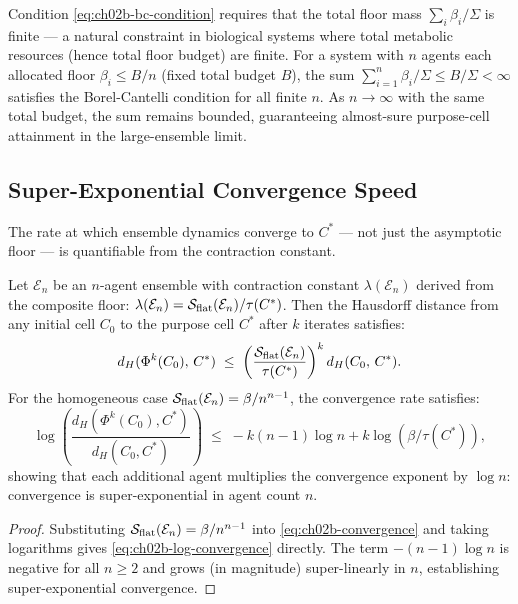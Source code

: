 \begin{remark}
Condition \eqref{eq:ch02b-bc-condition} requires that the total floor mass
$\sum_i \beta_i / \Sigma$ is finite — a natural constraint in biological
systems where total metabolic resources (hence total floor budget) are finite.
For a system with $n$ agents each allocated floor $\beta_i \leq B/n$ (fixed
total budget $B$), the sum $\sum_{i=1}^n \beta_i / \Sigma \leq B/\Sigma < \infty$
satisfies the Borel-Cantelli condition for all finite $n$.  As $n \to \infty$
with the same total budget, the sum remains bounded, guaranteeing almost-sure
purpose-cell attainment in the large-ensemble limit.
\end{remark}

\subsection{Super-Exponential Convergence Speed}

The rate at which ensemble dynamics converge to $C^*$ — not just the
asymptotic floor — is quantifiable from the contraction constant.

\begin{proposition}
\label{prop:ch02b-convergence-speed}
Let $\mathcal{E}_n$ be an $n$-agent ensemble with contraction constant
$\lambda(\mathcal{E}_n)$ derived from the composite floor:
$\lambda(\mathcal{E}_n) = \mathcal{S}_{\mathrm{flat}}(\mathcal{E}_n) / \tau(C^*)$.
Then the Hausdorff distance from any initial cell $C_0$ to the purpose cell
$C^*$ after $k$ iterates satisfies:
\begin{equation}
  d_H(\Phi^k(C_0),\, C^*)
  \;\leq\;
  \left(\frac{\mathcal{S}_{\mathrm{flat}}(\mathcal{E}_n)}{\tau(C^*)}\right)^k
  d_H(C_0,\, C^*).
  \label{eq:ch02b-convergence}
\end{equation}
For the homogeneous case $\mathcal{S}_{\mathrm{flat}}(\mathcal{E}_n) = \beta /
n^{n-1}$, the convergence rate satisfies:
\begin{equation}
  \log\left(\frac{d_H(\Phi^k(C_0), C^*)}{d_H(C_0, C^*)}\right)
  \;\leq\;
  -k(n-1)\log n + k\log(\beta/\tau(C^*)),
  \label{eq:ch02b-log-convergence}
\end{equation}
showing that each additional agent multiplies the convergence exponent by
$\log n$: convergence is super-exponential in agent count $n$.
\end{proposition}

\begin{proof}
Substituting $\mathcal{S}_{\mathrm{flat}}(\mathcal{E}_n) = \beta / n^{n-1}$ into
\eqref{eq:ch02b-convergence} and taking logarithms gives
\eqref{eq:ch02b-log-convergence} directly.  The term $-(n-1)\log n$ is
negative for all $n \geq 2$ and grows (in magnitude) super-linearly in $n$,
establishing super-exponential convergence.
\end{proof}

